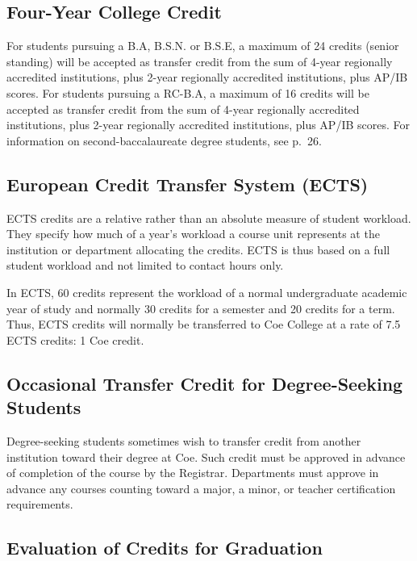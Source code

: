 \documentclass[
  letterpaper,
]{scrbook}
\begin{document}
\subsection{Four-Year College Credit}\label{four-year-college-credit}

For students pursuing a B.A, B.S.N. or B.S.E, a maximum of 24 credits
(senior standing) will be accepted as transfer credit from the sum of
4-year regionally accredited institutions, plus 2-year regionally
accredited institutions, plus AP/IB scores. For students pursuing a
RC-B.A, a maximum of 16 credits will be accepted as transfer credit from
the sum of 4-year regionally accredited institutions, plus 2-year
regionally accredited institutions, plus AP/IB scores. For information
on second-baccalaureate degree students, see p.~26.

\subsection{European Credit Transfer System
(ECTS)}\label{european-credit-transfer-system-ects}

ECTS credits are a relative rather than an absolute measure of student
workload. They specify how much of a year's workload a course unit
represents at the institution or department allocating the credits. ECTS
is thus based on a full student workload and not limited to contact
hours only.

In ECTS, 60 credits represent the workload of a normal undergraduate
academic year of study and normally 30 credits for a semester and 20
credits for a term. Thus, ECTS credits will normally be transferred to
Coe College at a rate of 7.5 ECTS credits: 1 Coe credit.

\subsection{Occasional Transfer Credit for Degree-Seeking
Students}\label{occasional-transfer-credit-for-degree-seeking-students}

Degree-seeking students sometimes wish to transfer credit from another
institution toward their degree at Coe. Such credit must be approved in
advance of completion of the course by the Registrar. Departments must
approve in advance any courses counting toward a major, a minor, or
teacher certification requirements.

\subsection{Evaluation of Credits for
Graduation}\label{evaluation-of-credits-for-graduation}
\end{document}
